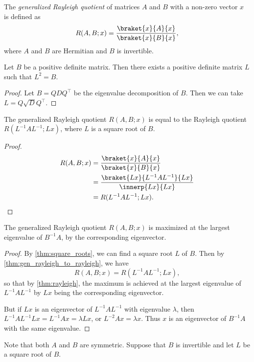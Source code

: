 \begin{definition*} \label{def:gen_rayleigh}
    The \emph{generalized Rayleigh quotient} of matrices $A$ and $B$ with
    a non-zero vector $x$ is defined as \[
        R(A, B; x) = \frac{\braket{x}{A}{x}}{\braket{x}{B}{x}},
    \] where $A$ and $B$ are Hermitian and $B$ is invertible.
\end{definition*}
\begin{lemma*} \label{thm:square_roots}
    Let $B$ be a positive definite matrix.
    Then there exists a positive definite matrix $L$ such that $L^2 = B$.
\end{lemma*}
\begin{proof}
    Let $B = QDQ^\top$ be the eigenvalue decomposition of $B$.
    Then we can take $L = Q\sqrt{D}Q^\top$.
\end{proof}
\begin{lemma} \label{thm:gen_rayleigh_to_rayleigh}
    The generalized Rayleigh quotient $R(A, B; x)$ is equal to the
    Rayleigh quotient $R(L^{-1}AL^{-1}; L x)$,
    where $L$ is a square root of $B$.
\end{lemma}
\begin{proof}
    \begin{align*}
        R(A, B; x) &= \frac{\braket{x}{A}{x}}{\braket{x}{B}{x}} \\
        &= \frac{\braket{Lx}{L^{-1}AL^{-1}}{Lx}}{\innerp{Lx}{Lx}} \\
        &= R(L^{-1}AL^{-1}; Lx). \qedhere
    \end{align*}
\end{proof}
\begin{theorem*} \label{thm:gen_rayleigh}
    The generalized Rayleigh quotient $R(A, B; x)$ is maximized at the
    largest eigenvalue of $B^{-1}A$, by the corresponding eigenvector.
\end{theorem*}
\begin{proof}
    By \cref{thm:square_roots}, we can find a square root $L$ of $B$.
    Then by \cref{thm:gen_rayleigh_to_rayleigh}, we have \[
        R(A, B; x) = R(L^{-1}AL^{-1}; Lx),
    \] so that by \cref{thm:rayleigh}, the maximum is achieved at the
    largest eigenvalue of $L^{-1}AL^{-1}$ by $Lx$ being the corresponding
    eigenvector.

    But if $Lx$ is an eigenvector of $L^{-1}AL^{-1}$ with eigenvalue
    $\lambda$, then $L^{-1}AL^{-1}Lx = L^{-1}A x = \lambda Lx$, or
    $L^{-2} A x = \lambda x$.
    Thus $x$ is an eigenvector of $B^{-1}A$ with the same eigenvalue.
\end{proof}
Note that both $A$ and $B$ are symmetric.
Suppose that $B$ is invertible and let $L$ be a square root of $B$.

